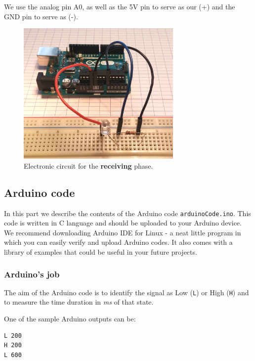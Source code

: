 \documentclass[10pt]{report}
\begin{document}
We use the analog pin A0, as well as the 5V pin to serve as our (+) and the GND pin to serve as (-).

\begin{figure}[H]
\centering\includegraphics[width=8cm]{receive_circuit}
\caption{Electronic circuit for the \textbf{receiving} phase.}				
\label{fig:receiving_circuit}
\end{figure}




\subsection{Arduino code}

In this part we describe the contents of the Arduino code \verb|arduinoCode.ino|. This code is written in C language and should be uploaded to your Arduino device. We recommend downloading Arduino IDE for Linux - a neat little program in which you can easily verify and upload Arduino codes. It also comes with a library of examples that could be useful in your future projects.

\subsubsection{Arduino's job}

The aim of the Arduino code is to identify the signal as Low (\verb|L|) or High (\verb|H|) and to measure the time duration in \textit{ms} of that state.

One of the sample Arduino outputs can be:

\begin{snugshade}
\begin{verbatim}
L 200
H 200
L 600
\end{verbatim}
\end{snugshade}
\end{document}
